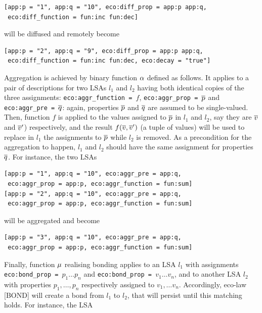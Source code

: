 \documentclass[12pt,a4paper,twoside,openright]{book}
\begin{document}
{\begin{Verbatim}[samepage=true, frame=single]
[app:p = "1", app:q = "10", eco:diff_prop = app:p app:q, 
 eco:diff_function = fun:inc fun:dec]
\end{Verbatim}
}

\noindent will be diffused and remotely become

{\begin{Verbatim}[samepage=true, frame=single]
[app:p = "2", app:q = "9", eco:diff_prop = app:p app:q, 
 eco:diff_function = fun:inc fun:dec, eco:decay = "true"]
\end{Verbatim}
}

Aggregation is achieved by binary function $\alpha$ defined as follows. It applies to a pair of descriptions for two LSAs $l_1$ and $l_2$ having both identical copies of the three assignments: \texttt{eco:aggr\_function = $f$}, \texttt{eco:aggr\_prop = $\overline{p}$} and \texttt{eco:aggr\_pre = $\overline{q}$}: again, properties $\overline{p}$ and $\overline{q}$ are assumed to be single-valued.
%
Then, function $f$ is applied to the values assigned to $\overline{p}$ in $l_1$ and $l_2$, say they are $\overline{v}$ and $\overline{v}'$) respectively, and the result $f(\overline{v},\overline{v}')$ (a tuple of values) will be used to replace in $l_1$ the assignments to $\overline{p}$ while $l_2$ is removed.
%
As a precondition for the aggregation to happen, $l_1$ and $l_2$ should have the same assignment for properties $\overline{q}$.
%
For instance, the two LSAs

{\begin{Verbatim}[samepage=true, frame=single]
[app:p = "1", app:q = "10", eco:aggr_pre = app:q, 
 eco:aggr_prop = app:p, eco:aggr_function = fun:sum]
[app:p = "2", app:q = "10", eco:aggr_pre = app:q, 
 eco:aggr_prop = app:p, eco:aggr_function = fun:sum]
\end{Verbatim}
}

will be aggregated and become

{\begin{Verbatim}[samepage=true, frame=single]
[app:p = "3", app:q = "10", eco:aggr_pre = app:q, 
 eco:aggr_prop = app:p, eco:aggr_function = fun:sum]
\end{Verbatim}
}

Finally, function $\mu$ realising bonding applies to an LSA $l_1$ with assignments \texttt{eco:bond\_prop = $p_1 \ldots p_n$} and \texttt{eco:bond\_prop = $v_1 \ldots v_n$}, and to another LSA $l_2$ with properties $p_1,\ldots,p_n$ respectively assigned to $v_1,\ldots v_n$.
%
Accordingly, eco-law [BOND] will create a bond from $l_1$ to $l_2$, that will persist until this matching holds.
%
For instance, the LSA
\end{document}
